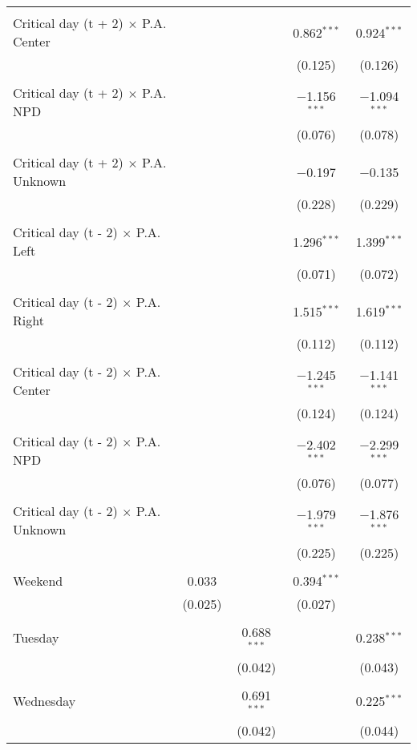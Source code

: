 \documentclass[
]{article}
\begin{document}
\begin{table}[!htbp]
{\begin{tabular}{@{\extracolsep{5pt}}lcccc}
  & & & & \\ 
 Critical day (t + 2) $\times$ P.A. Center &  &  & 0.862$^{***}$ & 0.924$^{***}$ \\ 
  &  &  & (0.125) & (0.126) \\ 
  & & & & \\ 
 Critical day (t + 2) $\times$ P.A. NPD &  &  & $-$1.156$^{***}$ & $-$1.094$^{***}$ \\ 
  &  &  & (0.076) & (0.078) \\ 
  & & & & \\ 
 Critical day (t + 2) $\times$ P.A. Unknown &  &  & $-$0.197 & $-$0.135 \\ 
  &  &  & (0.228) & (0.229) \\ 
  & & & & \\ 
 Critical day (t - 2) $\times$ P.A. Left &  &  & 1.296$^{***}$ & 1.399$^{***}$ \\ 
  &  &  & (0.071) & (0.072) \\ 
  & & & & \\ 
 Critical day (t - 2) $\times$ P.A. Right &  &  & 1.515$^{***}$ & 1.619$^{***}$ \\ 
  &  &  & (0.112) & (0.112) \\ 
  & & & & \\ 
 Critical day (t - 2) $\times$ P.A. Center &  &  & $-$1.245$^{***}$ & $-$1.141$^{***}$ \\ 
  &  &  & (0.124) & (0.124) \\ 
  & & & & \\ 
 Critical day (t - 2) $\times$ P.A. NPD &  &  & $-$2.402$^{***}$ & $-$2.299$^{***}$ \\ 
  &  &  & (0.076) & (0.077) \\ 
  & & & & \\ 
 Critical day (t - 2) $\times$ P.A. Unknown &  &  & $-$1.979$^{***}$ & $-$1.876$^{***}$ \\ 
  &  &  & (0.225) & (0.225) \\ 
  & & & & \\ 
 Weekend & 0.033 &  & 0.394$^{***}$ &  \\ 
  & (0.025) &  & (0.027) &  \\ 
  & & & & \\ 
 Tuesday &  & 0.688$^{***}$ &  & 0.238$^{***}$ \\ 
  &  & (0.042) &  & (0.043) \\ 
  & & & & \\ 
 Wednesday &  & 0.691$^{***}$ &  & 0.225$^{***}$ \\ 
  &  & (0.042) &  & (0.044) \\ 

\end{tabular}}
\end{table}
\end{document}
